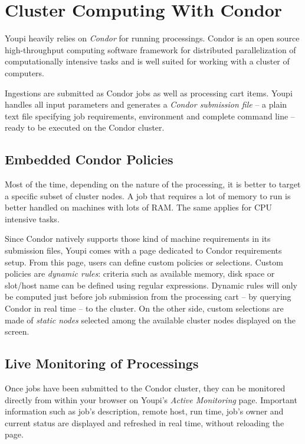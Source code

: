 \documentclass[11pt,twoside]{article}  %
\begin{document}
\section{Cluster Computing With Condor}

Youpi heavily relies on \emph{Condor} for running processings. Condor is an open source 
high-throughput computing software framework for distributed parallelization of computationally 
intensive tasks and is well suited for working with a cluster of computers.

Ingestions are submitted as Condor jobs as well as processing cart items. Youpi handles 
all input parameters and generates a \emph{Condor submission file} -- a plain text file 
specifying job requirements, environment and complete command line -- ready to be executed 
on the Condor cluster.

\subsection{Embedded Condor Policies}

Most of the time, depending on the nature of the processing, it is better to target a 
specific subset of cluster nodes. A job that requires a lot of memory to run is better 
handled on machines with lots of RAM. The same applies for CPU intensive tasks.

Since Condor natively supports those kind of machine requirements in its submission files,
Youpi comes with a page dedicated to Condor requirements setup. From this page, users can 
define custom policies or selections. Custom policies are \emph{dynamic rules}: criteria
such as available memory, disk space or slot/host name can be defined using regular expressions.
Dynamic rules will only be computed just before job submission from the processing cart -- by 
querying Condor in real time -- to the cluster. On the other side, custom selections are 
made of \emph{static nodes} selected among the available cluster nodes displayed on the screen.

\subsection{Live Monitoring of Processings}

Once jobs have been submitted to the Condor cluster, they can be monitored directly from 
within your browser on Youpi's \emph{Active Monitoring} page. Important information such as 
job's description, remote host, run time, job's owner and current status are displayed and 
refreshed in real time, without reloading the page.
\end{document}
